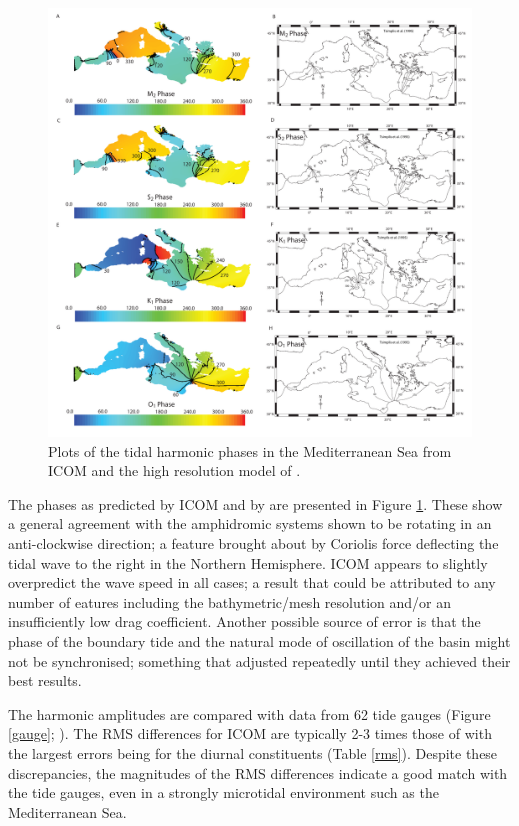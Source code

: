 \begin{figure}[t!]
\centering
\includegraphics[width=\textwidth]{./examples_images/tides_in_the_Mediterranean_Sea/phase.pdf}
\caption{Plots of the tidal harmonic phases in the Mediterranean Sea from ICOM and the high resolution
model of \citet{Tsimplis1995}. } 
\label{phase}
\end{figure}

The phases as predicted by ICOM and by \citet{Tsimplis1995} are presented in Figure \ref{phase}. These show
a general agreement with the amphidromic systems shown to be rotating in an anti-clockwise direction; a feature
brought about by Coriolis force deflecting the tidal wave to the right in the Northern Hemisphere.
ICOM appears to slightly overpredict the wave speed in all cases; a result that could be attributed to any number of eatures including the
bathymetric/mesh resolution and/or an insufficiently low drag coefficient. Another possible source of error is that the
phase of the boundary tide and the natural mode of oscillation of the basin might not be synchronised; something that
\citet{Tsimplis1995} adjusted repeatedly until they achieved their best results.
 
The harmonic amplitudes are compared with data from 62 tide gauges (Figure \ref{gauge}; \citealp{Tsimplis1995,Wells2008}).
The RMS differences for ICOM are typically 2-3 times those of \citet{Tsimplis1995}    
with the largest errors being for the diurnal constituents (Table \ref{rms}). Despite these discrepancies, the
magnitudes of the RMS differences indicate a good match with the tide gauges, even in a strongly microtidal environment 
such as the Mediterranean Sea. 

